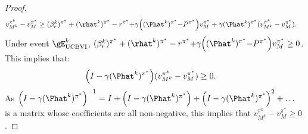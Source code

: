 \begin{subappendices}
\begin{proof}
\begin{align*}
    v_{M^k}^{\pi^k} -v_M^{\pi^*}
    &\ge (\beta_r^{k})^{\pi^*} +(\rhat^{k})^{\pi^*} -r^{\pi^*} {+}\gamma\Bigl((\Phat^{k})^{\pi^*} {-}P^{\pi^*}\Bigr)v_M^{\pi^*} +\gamma (\Phat^{k})^{\pi^*}(v_{M^k}^{\pi^k} -v_M^{\pi^*}).
\end{align*}
Under event $\gE^{k}_\text{UCBVI}$, $(\beta_r^{k})^{\pi^*} +(\rhat^{k})^{\pi^*} -r^{\pi^*} {+}\gamma\Bigl((\Phat^{k})^{\pi^*} {-}P^{\pi^*}\Bigr)v_M^{\pi^*}\ge 0$. This implies that:
\begin{align*}
    \Bigl(I-\gamma (\Phat^{k})^{\pi^*}\Bigr)(v_{M^k}^{\pi^k} -v_M^{\pi^*}) &\ge 0.
\end{align*}
As $\Bigl(I-\gamma (\Phat^{k})^{\pi^*}\Bigr)^{-1} = I+ \Bigl(I-\gamma (\Phat^{k})^{\pi^*}\Bigr) +\Bigl(I-\gamma (\Phat^{k})^{\pi^*}\Bigr)^2 +\dots$ is a matrix whose coefficients are all non-negative, this implies that $v_{M^k}^{\pi^k} -v_M^{\pi^*} \ge 0$. 
\end{proof}


\end{subappendices}
